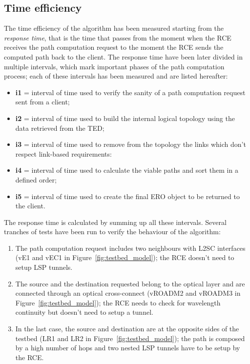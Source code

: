 \documentclass[10pt,a4paper]{report}
\begin{document}
\subsection{Time efficiency}
The time efficiency of the algorithm has been measured starting from
the \textit{response time}, that is the time that passes from the
moment when the RCE receives the path computation request to the
moment the RCE sends the computed path back to the client. The
response time have been later divided in multiple intervals, which
mark important phases of the path computation process; each of these
intervals has been measured and are listed hereafter:
\begin{itemize}
\item \textbf{i1} = interval of time used to verify the sanity of a
  path computation request sent from a client;
\item \textbf{i2} = interval of time used to build the internal logical
  topology using the data retrieved from the TED;
\item \textbf{i3} = interval of time used to remove from the topology
  the links which don't respect link-based requirements:
\item \textbf{i4} = interval of time used to calculate the viable paths and
  sort them in a defined order;
\item \textbf{i5} = interval of time used to create the final ERO
  object to be returned to the client.
\end{itemize}
The response time is calculated by summing up all these
intervals. Several tranches of tests have been run to verify the
behaviour of the algorithm:
\begin{enumerate}
\item The path computation request includes two neighbours with L2SC
  interfaces (vE1 and vEC1 in Figure~\ref{fig:testbed_model}); the RCE
  doesn't need to setup LSP tunnels.
\item The source and the destination requested belong to the optical
  layer and are connected through an optical cross-connect (vROADM2
  and vROADM3 in Figure~\ref{fig:testbed_model}); the RCE needs to
  check for wavelength continuity but doesn't need to setup a tunnel.
\item In the last case, the source and destination are at the opposite
  sides of the testbed (LR1 and LR2 in
  Figure~\ref{fig:testbed_model}); the path is composed by a high
  number of hops and two nested LSP tunnels have to be setup by the
  RCE.
\end{enumerate}
\end{document}
